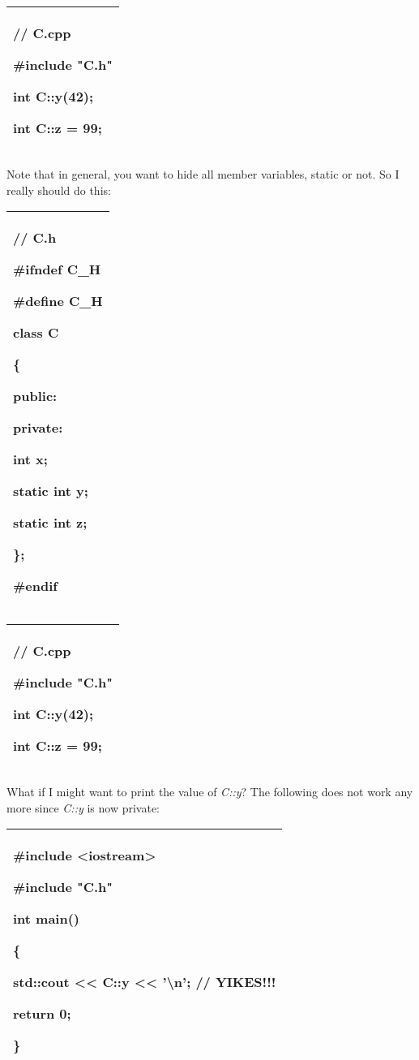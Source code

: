 \documentclass[
]{article}
\begin{document}
\begin{longtable}[]{@{}l@{}}
\toprule
\endhead
\begin{minipage}[t]{0.97\columnwidth}\raggedright
// C.cpp

\#include "C.h"

int C::y(42);

int C::z = 99;\strut
\end{minipage}\tabularnewline
\bottomrule
\end{longtable}

Note that in general, you want to hide all member variables, static or
not. So I really should do this:

\begin{longtable}[]{@{}l@{}}
\toprule
\endhead
\begin{minipage}[t]{0.97\columnwidth}\raggedright
// C.h

\#ifndef C\_H

\#define C\_H

class C

\{

public:

private:

int x;

static int y;

static int z;

\};

\#endif\strut
\end{minipage}\tabularnewline
\bottomrule
\end{longtable}

\begin{longtable}[]{@{}l@{}}
\toprule
\endhead
\begin{minipage}[t]{0.97\columnwidth}\raggedright
// C.cpp

\#include "C.h"

int C::y(42);

int C::z = 99;\strut
\end{minipage}\tabularnewline
\bottomrule
\end{longtable}

What if I might want to print the value of \emph{C::y}? The following
does not work any more since \emph{C::y} is now private:

\begin{longtable}[]{@{}l@{}}
\toprule
\endhead
\begin{minipage}[t]{0.97\columnwidth}\raggedright
\#include \textless iostream\textgreater{}

\#include "C.h"

int main()

\{

std::cout \textless\textless{} C::y \textless\textless{}
'\textbackslash n'; // YIKES!!!

return 0;

\}\strut
\end{minipage}\tabularnewline
\bottomrule
\end{longtable}
\end{document}
